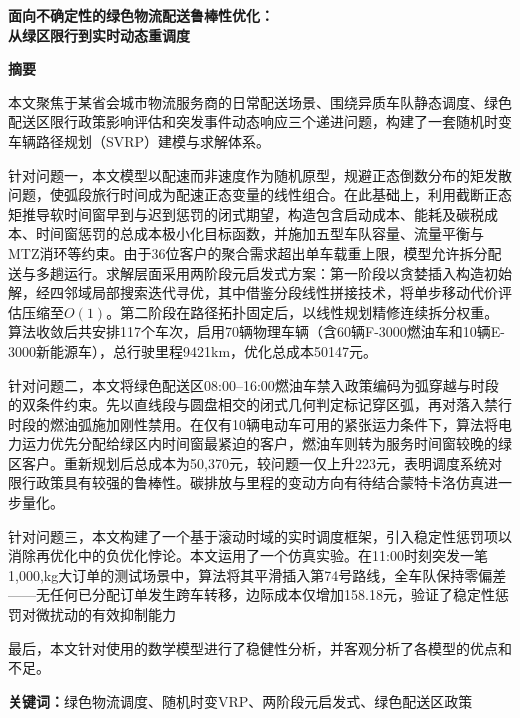 \documentclass[12pt,a4paper]{article}
\newcommand{\jiacu}[1]{\textbf{\bfseries\heiti #1}}
\begin{document}
\begin{center}
	\fontsize{15.75pt}{0}\jiacu{面向不确定性的绿色物流配送鲁棒性优化：\\
    从绿区限行到实时动态重调度}
\end{center}
\begin{center}
	\jiacu{摘\quad 要}
\end{center}

本文聚焦于某省会城市物流服务商的日常配送场景、围绕异质车队静态调度、绿色配送区限行政策影响评估和突发事件动态响应三个递进问题，构建了一套随机时变车辆路径规划（SVRP）建模与求解体系。

针对问题一，本文模型以配速而非速度作为随机原型，规避正态倒数分布的矩发散问题，使弧段旅行时间成为配速正态变量的线性组合。在此基础上，利用截断正态矩推导软时间窗早到与迟到惩罚的闭式期望，构造包含启动成本、能耗及碳税成本、时间窗惩罚的总成本极小化目标函数，并施加五型车队容量、流量平衡与MTZ消环等约束。由于36位客户的聚合需求超出单车载重上限，模型允许拆分配送与多趟运行。求解层面采用两阶段元启发式方案：第一阶段以贪婪插入构造初始解，经四邻域局部搜索迭代寻优，其中借鉴分段线性拼接技术，将单步移动代价评估压缩至$O(1)$。第二阶段在路径拓扑固定后，以线性规划精修连续拆分权重。算法收敛后共安排117个车次，启用70辆物理车辆（含60辆F-3000燃油车和10辆E-3000新能源车），总行驶里程9421km，优化总成本50147元。

针对问题二，本文将绿色配送区08:00–16:00燃油车禁入政策编码为弧穿越与时段的双条件约束。先以直线段与圆盘相交的闭式几何判定标记穿区弧，再对落入禁行时段的燃油弧施加刚性禁用。在仅有10辆电动车可用的紧张运力条件下，算法将电力运力优先分配给绿区内时间窗最紧迫的客户，燃油车则转为服务时间窗较晚的绿区客户。重新规划后总成本为50,370元，较问题一仅上升223元，表明调度系统对限行政策具有较强的鲁棒性。碳排放与里程的变动方向有待结合蒙特卡洛仿真进一步量化。

针对问题三，本文构建了一个基于滚动时域的实时调度框架，引入稳定性惩罚项以消除再优化中的负优化悖论。本文运用了一个仿真实验。在11:00时刻突发一笔1,000,kg大订单的测试场景中，算法将其平滑插入第74号路线，全车队保持零偏差——无任何已分配订单发生跨车转移，边际成本仅增加158.18元，验证了稳定性惩罚对微扰动的有效抑制能力

最后，本文针对使用的数学模型进行了稳健性分析，并客观分析了各模型的优点和不足。

\bigskip

\noindent 

\jiacu{关键词：}绿色物流调度、随机时变VRP、两阶段元启发式、绿色配送区政策
\newpage

\tableofcontents
\newpage
\end{document}
